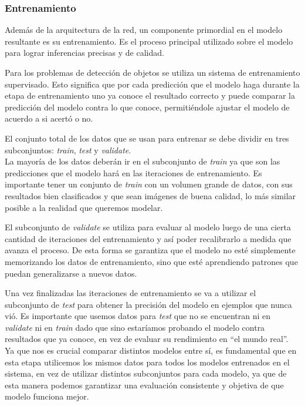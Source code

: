 \documentclass[a4paper]{article}
\begin{document}
\subsubsection{Entrenamiento}

Además de la arquitectura de la red, un componente primordial en el modelo resultante es su entrenamiento. Es el proceso principal utilizado sobre el modelo para lograr inferencias precisas y de calidad.

Para los problemas de detección de objetos se utiliza un sistema de entrenamiento supervisado. Esto significa que por cada predicción que el modelo haga durante la etapa de entrenamiento uno ya conoce el resultado correcto y puede comparar la predicción del modelo contra lo que conoce, permitiéndole ajustar el modelo de acuerdo a si acertó o no.

El conjunto total de los datos que se usan para entrenar se debe dividir en tres subconjuntos: \textit{train}, \textit{test} y \textit{validate}.\\

La mayoría de los datos deberán ir en el subconjunto de \textit{train} ya que son las predicciones que el modelo hará en las iteraciones de entrenamiento. Es importante tener un conjunto de \textit{train} con un volumen grande de datos, con sus resultados bien clasificados y que sean imágenes de buena calidad, lo más similar posible a la realidad que queremos modelar.

El subconjunto de \textit{validate} se utiliza para evaluar al modelo luego de una cierta cantidad de iteraciones del entrenamiento y así poder recalibrarlo a medida que avanza el proceso. De esta forma se garantiza que el modelo no esté simplemente memorizando los datos de entrenamiento, sino que esté aprendiendo patrones que puedan generalizarse a nuevos datos.

Una vez finalizadas las iteraciones de entrenamiento se va a utilizar el subconjunto de \textit{test} para obtener la precisión del modelo en ejemplos que nunca vió. Es importante que usemos datos para \textit{test} que no se encuentran ni en \textit{validate} ni en \textit{train} dado que sino estaríamos probando el modelo contra resultados que ya conoce, en vez de evaluar su rendimiento en ``el mundo real''. Ya que nos es crucial comparar distintos modelos entre sí, es fundamental que en esta etapa utilicemos los mismos datos para todos los modelos entrenados en el sistema, en vez de utilizar distintos subconjuntos para cada modelo, ya que de esta manera podemos garantizar una evaluación consistente y objetiva de que modelo funciona mejor.\\
\end{document}
